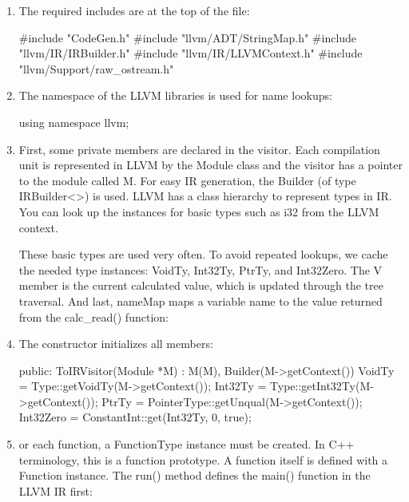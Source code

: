 \begin{enumerate}
\item
The required includes are at the top of the file:

\begin{cpp}
#include "CodeGen.h"
#include "llvm/ADT/StringMap.h"
#include "llvm/IR/IRBuilder.h"
#include "llvm/IR/LLVMContext.h"
#include "llvm/Support/raw_ostream.h"
\end{cpp}

\item
The namespace of the LLVM libraries is used for name lookups:

\begin{cpp}
using namespace llvm;
\end{cpp}

\item
First, some private members are declared in the visitor. Each compilation unit is represented in LLVM by the Module class and the visitor has a pointer to the module called M. For easy IR generation, the Builder (of type IRBuilder<>) is used. LLVM has a class hierarchy to represent types in IR. You can look up the instances for basic types such as i32 from the LLVM context.

These basic types are used very often. To avoid repeated lookups, we cache the needed type instances: VoidTy, Int32Ty, PtrTy, and Int32Zero. The V member is the current calculated value, which is updated through the tree traversal. And last, nameMap maps a variable name to the value returned from the calc\_read() function:

\begin{cpp}
namespace {
class ToIRVisitor : public ASTVisitor {
    Module *M;
    IRBuilder<> Builder;
    Type *VoidTy;
    Type *Int32Ty;
    PointerType *PtrTy;
    Constant *Int32Zero;
    Value *V;
    StringMap<Value *> nameMap;
\end{cpp}

\item
The constructor initializes all members:

\begin{cpp}
public:
    ToIRVisitor(Module *M) : M(M), Builder(M->getContext())
    {
        VoidTy = Type::getVoidTy(M->getContext());
        Int32Ty = Type::getInt32Ty(M->getContext());
        PtrTy = PointerType::getUnqual(M->getContext());
        Int32Zero = ConstantInt::get(Int32Ty, 0, true);
    }
\end{cpp}

\item
or each function, a FunctionType instance must be created. In C++ terminology, this is a function prototype. A function itself is defined with a Function instance. The run() method defines the main() function in the LLVM IR first:


\end{enumerate}

